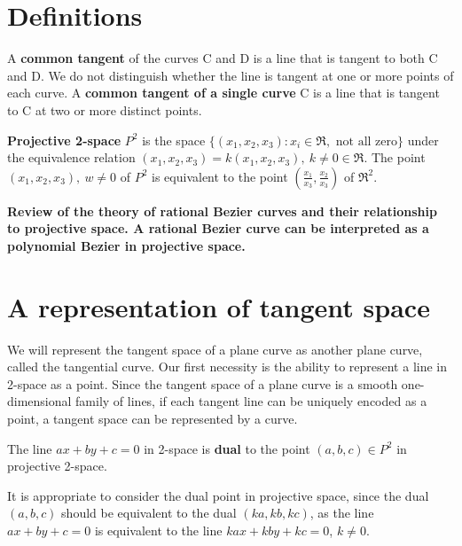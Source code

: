 \documentclass[11pt]{article}
\begin{document}

\section{Definitions}
\label{sec:defn}

\begin{defn2}
A {\bf common tangent} of the curves C and D is a line that is tangent to both C and D.
We do not distinguish whether the line is tangent at one or more points
of each curve.
A {\bf common tangent of a single curve} C is a line that is tangent to C at two or more
distinct points.
\end{defn2}

\begin{defn2}
{\bf Projective 2-space} $P^2$ is the space 
$\{(x_1,x_2,x_3) : x_i \in \Re, \mbox{ not all zero}\}$
under the equivalence relation $(x_1,x_2,x_3) = k(x_1,x_2,x_3),\ k \neq 0 \in \Re$.
The point $(x_1,x_2,x_3),\ w \neq 0$ of $P^2$ is equivalent to the point
$(\frac{x_1}{x_3}, \frac{x_2}{x_3})$ of $\Re^2$.
\end{defn2}

{\bf 
Review of the theory of rational Bezier curves and their relationship
to projective space.
A rational Bezier curve can be interpreted as a polynomial Bezier in projective
space.}


\clearpage

\section{A representation of tangent space}
\label{sec:dual}

We will represent the tangent space of a plane curve as another
plane curve, called the tangential curve.
Our first necessity is the ability to represent a line in 2-space as a point.
Since the tangent space of a plane curve is a smooth one-dimensional family 
of lines,
if each tangent line can be uniquely encoded as a point, 
a tangent space can be represented by a curve.

\begin{defn2}
\label{defn:dual}
The line $ax+by+c=0$ in 2-space is {\bf dual} to the point $(a,b,c) \in P^2$
in projective 2-space.
\end{defn2}
%
%
It is appropriate to consider the dual point in projective space,
since the dual $(a,b,c)$ should be equivalent to the dual $(ka,kb,kc)$,
as the line $ax + by + c = 0$ is equivalent to the line
$kax + kby + kc = 0$, $k \neq 0$.
\end{document}
